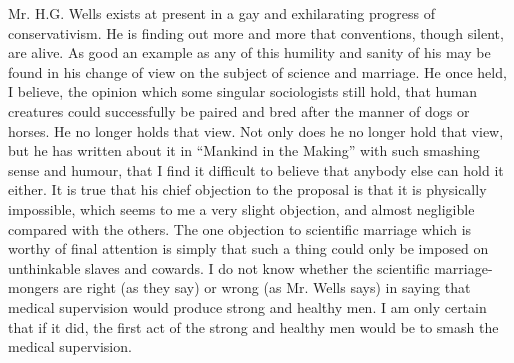 Mr. H.G. Wells exists at present in a gay and exhilarating progress of conservativism. He is finding out more and more that conventions, though silent, are alive. As good an example as any of this humility and sanity of his may be found in his change of view on the subject of science and marriage. He once held, I believe, the opinion which some singular sociologists still hold, that human creatures could successfully be paired and bred after the manner of dogs or horses. He no longer holds that view. Not only does he no longer hold that view, but he has written about it in “Mankind in the Making” with such smashing sense and humour, that I find it difficult to believe that anybody else can hold it either. It is true that his chief objection to the proposal is that it is physically impossible, which seems to me a very slight objection, and almost negligible compared with the others. The one objection to scientific marriage which is worthy of final attention is simply that such a thing could only be imposed on unthinkable slaves and cowards. I do not know whether the scientific marriage-mongers are right (as they say) or wrong (as Mr. Wells says) in saying that medical supervision would produce strong and healthy men. I am only certain that if it did, the first act of the strong and healthy men would be to smash the medical supervision.

